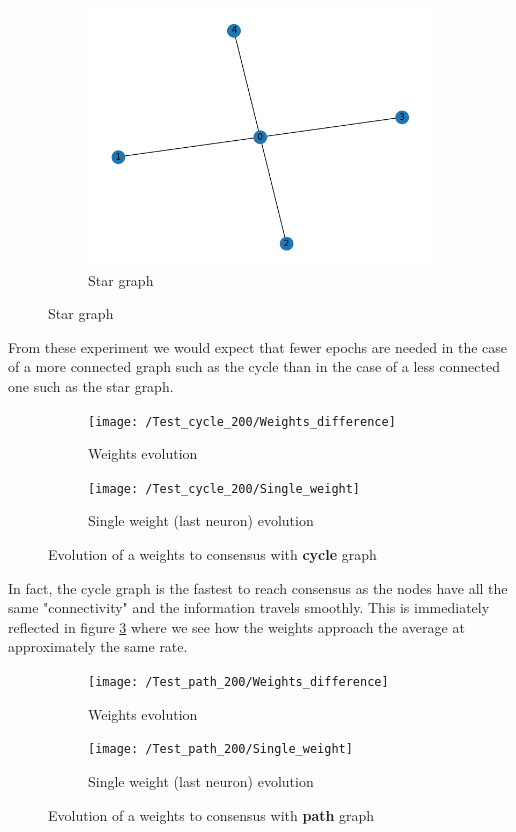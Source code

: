 \documentclass[a4paper,11pt,oneside]{book}
\begin{document}
\begin{figure}[H]
\begin{subfigure}{0.32\textwidth}
    \includegraphics[width=\textwidth]{figs/Test_star_200/Graph.png}
    \caption{Star graph}
    \end{subfigure}
\label{graphs}
\end{figure}

From these experiment we would expect that fewer epochs are needed in the case of a more connected graph such as the cycle than in the case of a less connected one such as the star graph.

\begin{figure}[H]
\centering
	\begin{subfigure}{0.49\textwidth}	
	\texttt{[image: /Test\_cycle\_200/Weights\_difference]}
	\caption{Weights evolution}
	\end{subfigure}
\hfill
	\begin{subfigure}{0.49\textwidth}	
	\texttt{[image: /Test\_cycle\_200/Single\_weight]}
	\caption{Single weight (last neuron) evolution}
	\end{subfigure}
\caption{Evolution of a weights to consensus with \textbf{cycle} graph}
\label{cycle_test}
\end{figure}

In fact, the cycle graph is the fastest to reach consensus as the nodes have all the same "connectivity" and the information travels smoothly. This is immediately reflected in figure \ref{path_test} where we see how the weights approach the average at approximately the same rate.

\begin{figure}[h]
\centering
	\begin{subfigure}{0.49\textwidth}	
	\texttt{[image: /Test\_path\_200/Weights\_difference]}
	\caption{Weights evolution}
	\end{subfigure}
\hfill
	\begin{subfigure}{0.49\textwidth}	
	\texttt{[image: /Test\_path\_200/Single\_weight]}
	\caption{Single weight (last neuron) evolution}
	\end{subfigure}
\caption{Evolution of a weights to consensus with \textbf{path} graph}
\label{path_test}
\end{figure}
\end{document}
